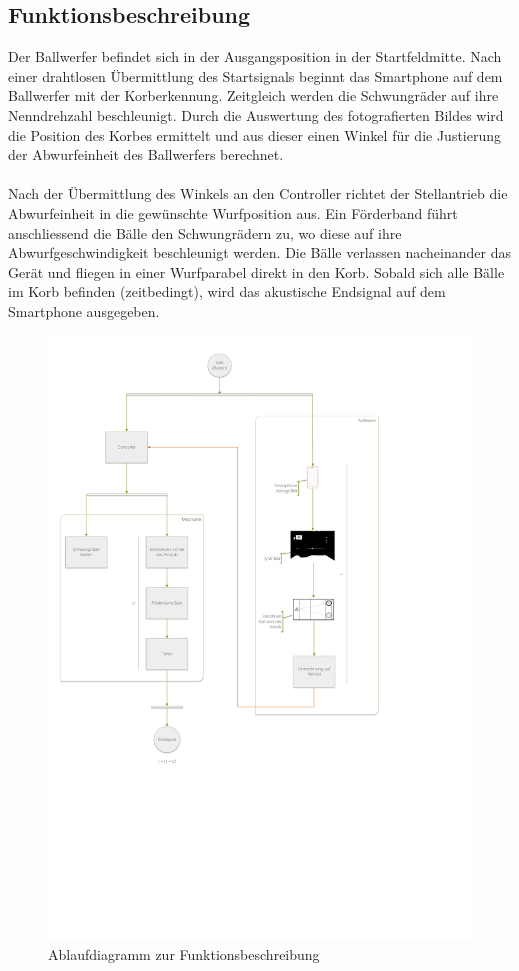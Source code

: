 \subsection{Funktionsbeschreibung}
Der Ballwerfer befindet sich in der Ausgangsposition in der Startfeldmitte. 
Nach einer drahtlosen Übermittlung des Startsignals beginnt das Smartphone auf 
dem Ballwerfer mit der Korberkennung. Zeitgleich werden die Schwungräder auf 
ihre Nenndrehzahl beschleunigt. Durch die Auswertung des fotografierten Bildes 
wird die Position des Korbes ermittelt und aus dieser einen Winkel für die 
Justierung der Abwurfeinheit des Ballwerfers berechnet.\\
\\
Nach der Übermittlung des Winkels an den Controller richtet der Stellantrieb 
die Abwurfeinheit in die gewünschte Wurfposition aus. Ein Förderband führt 
anschliessend die Bälle den Schwungrädern zu, wo diese auf ihre 
Abwurfgeschwindigkeit beschleunigt werden. Die Bälle verlassen nacheinander 
das Gerät und fliegen in einer Wurfparabel direkt in den Korb. Sobald sich 
alle Bälle im Korb befinden (zeitbedingt), wird das akustische Endsignal 
auf dem Smartphone ausgegeben.
\newpage
\begin{figure}[h!]
	\centering
	\includegraphics[width=1\textwidth,clip,trim=10mm 169mm 89mm 15mm]
	{Enddokumentation/Loesungskonzept/Bilder/FlowOnChart_v2.pdf}
	\caption{Ablaufdiagramm zur Funktionsbeschreibung}
	\label{fig:FlowChart}
\end{figure}
